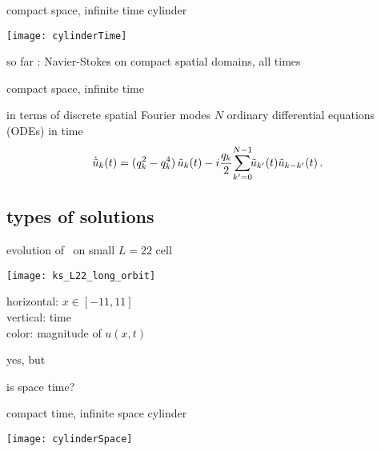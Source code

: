 \begin{frame}{compact space, infinite time cylinder}
\begin{center}
\texttt{[image: cylinderTime]}
\end{center}
so far : Navier-Stokes on compact spatial domains, all times
\end{frame}

\begin{frame}{compact space, infinite time \KS}

\begin{block}{in terms of discrete spatial Fourier modes}
$N$ ordinary differential equations (ODEs) in time
\[
\dot{\tilde{u}}_k(t) = ( q_k^2 - q_k^4 )\, \tilde{u}_k(t)
- i \frac{q_k}{2} \!\sum_{k'=0}^{N-1} \!\!\tilde{u}_{k'}(t) \tilde{u}_{k-k'}(t)
\,.
\]
\end{block}
\end{frame}


\subsection{types of solutions}
\begin{frame}{evolution of \KS\ on small $L=22$ cell}
\begin{center}
  \texttt{[image: ks\_L22\_long\_orbit]}
\end{center}
horizontal: $x \in [-11,11]$
\\
vertical: time
\\
color: magnitude of $u(x,t)$
\end{frame}

\begin{frame}{yes, but}
\begin{center}
{\huge is space time?}
\end{center}
\end{frame}

\begin{frame}{compact time, infinite space cylinder}
\begin{center}
\texttt{[image: cylinderSpace]}
\end{center}
\end{frame}

